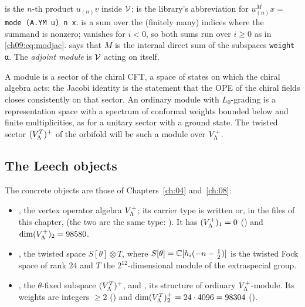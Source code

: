 \begin{dictionary}
 is the $n$-th product $u_{(n)}v$ inside $\mathcal{V}$;  is
the library's abbreviation for $u^M_{(n)}x=$ \texttt{mode (A.YM u) n x}.  is a sum
over the (finitely many) indices where the summand is nonzero;  vanishes for $i<0$,
so both sums run over $i\ge0$ as in \eqref{ch09:eq:modjac}. 
says that $M$ is the internal direct sum of the subspaces \texttt{weight α}. The
\emph{adjoint module}  is $\mathcal{V}$ acting on itself.
\end{dictionary}

\begin{physics}
A module is a sector of the chiral CFT, a space of states on which the chiral algebra acts: the Jacobi identity is the statement that the OPE of the chiral fields closes consistently on that sector. An ordinary module with $L_0$-grading is a representation space with a spectrum of conformal weights bounded below and finite multiplicities, as for a unitary sector with a ground state. The twisted sector $(V_{\Lambda}^{T})^{+}$ of the orbifold will be such a module over $V_{\Lambda}^{+}$.
\end{physics}

\subsection{The Leech objects}\label{ch09:sec:leechobjects}

The concrete objects are those of Chapters~\ref{ch:04} and~\ref{ch:08}:
\begin{itemize}
\item {}, the vertex operator algebra
$V_{\Lambda}^{+}$; its carrier type is written  or, in the files of this chapter,
 (the two are the same type: ).
It has $(V_{\Lambda}^{+})_1=0$ () and $\dim(V_{\Lambda}^{+})_2=98580$.
\item {}, the twisted space $S[\theta]\otimes T$, where
$S[\theta]={\mathbb{C}}[h_i(-n-\tfrac12)]$ is the twisted Fock space of rank $24$ and $T$ the
$2^{12}$-dimensional module of the extraspecial group.
\item {}, the $\theta$-fixed subspace $(V_{\Lambda}^{T})^{+}$, and
, its structure of ordinary
$V_{\Lambda}^{+}$-module. Its weights are integers $\ge2$ () and
$\dim(V_{\Lambda}^{T})^{+}_{2}=24\cdot4096=98304$ ().
\end{itemize}

